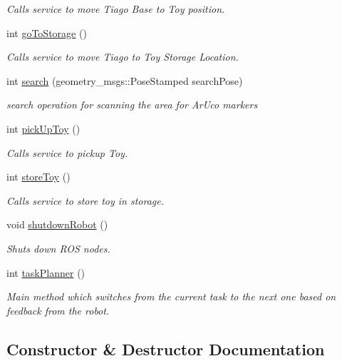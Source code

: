 \begin{DoxyCompactItemize}
\begin{DoxyCompactList}\small\item\em Calls service to move Tiago Base to Toy position. \end{DoxyCompactList}\item 
int \hyperlink{classTaskPlanner_a8c564e25fffe19f9164723fb8dac03a2}{go\+To\+Storage} ()
\begin{DoxyCompactList}\small\item\em Calls service to move Tiago to Toy Storage Location. \end{DoxyCompactList}\item 
int \hyperlink{classTaskPlanner_abb44ac3329ee21a3da250492c564ab74}{search} (geometry\+\_\+msgs\+::\+Pose\+Stamped search\+Pose)
\begin{DoxyCompactList}\small\item\em search operation for scanning the area for Ar\+Uco markers \end{DoxyCompactList}\item 
int \hyperlink{classTaskPlanner_a3b20363d2cb4b2abe5af5646c76b85d5}{pick\+Up\+Toy} ()
\begin{DoxyCompactList}\small\item\em Calls service to pickup Toy. \end{DoxyCompactList}\item 
int \hyperlink{classTaskPlanner_acc35c29d80d8849cfd73070633eaa3e1}{store\+Toy} ()
\begin{DoxyCompactList}\small\item\em Calls service to store toy in storage. \end{DoxyCompactList}\item 
void \hyperlink{classTaskPlanner_a9a7f370e15d723831153992c6b6f9cd7}{shutdown\+Robot} ()
\begin{DoxyCompactList}\small\item\em Shuts down R\+OS nodes. \end{DoxyCompactList}\item 
int \hyperlink{classTaskPlanner_ae0d072f084358dcda2ff6fee665aad35}{task\+Planner} ()
\begin{DoxyCompactList}\small\item\em Main method which switches from the current task to the next one based on feedback from the robot. \end{DoxyCompactList}\end{DoxyCompactItemize}


\subsection{Constructor \& Destructor Documentation}
